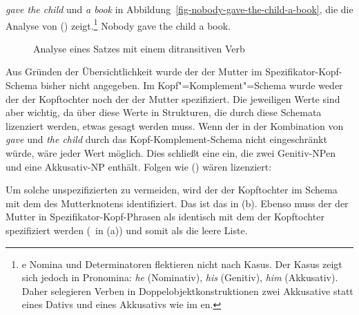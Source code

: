 \emph{gave the child} und \emph{a book} in Abbildung~\vref{fig-nobody-gave-the-child-a-book}, die die
Analyse von () zeigt.\footnote{%
  e Nomina und Determinatoren flektieren nicht nach Kasus. Der Kasus zeigt sich jedoch in Pronomina:
  \emph{he} (Nominativ), \emph{his} (Genitiv), \emph{him} (Akkusativ). Daher selegieren Verben in Doppelobjektkonstruktionen zwei Akkusative statt eines Dativs und eines Akkusativs wie im en.
}
\ea
\label{ex-nobody-gave-the-child-a-book}
Nobody gave the child a book.
\z
\begin{figure}
\caption{\label{fig-nobody-gave-the-child-a-book}Analyse eines Satzes mit einem ditransitiven Verb}
\end{figure}

Aus Gründen der Übersichtlichkeit wurde der \compsw der Mutter im
Spezifikator-Kopf-Schema bisher nicht angegeben. Im
Kopf"=Komplement"=Schema wurde weder der \sprw der Kopftochter noch der der Mutter spezifiziert. Die
jeweiligen Werte sind aber wichtig, da über diese Werte in Strukturen, die durch diese Schemata lizenziert werden,
etwas gesagt werden muss. Wenn der \sprw in der Kombination von \emph{gave} und \emph{the
  child} durch das Kopf-Komplement-Schema nicht eingeschränkt würde, wäre jeder Wert möglich. Dies
schließt eine \sprl ein, die zwei Genitiv-NPen und eine Akkusativ-NP enthält. Folgen wie () wären
lizenziert:

\z
Um solche unspezifizierten \sprwe zu vermeiden, wird der \sprw der Kopftochter im Schema mit dem \sprw des
Mutterknotens identifiziert. Das ist das  in (b). Ebenso muss der \compsw der Mutter
in Spezifikator-Kopf-Phrasen als identisch mit dem \compsw der Kopftochter spezifiziert werden
(\, in (a)) und somit als die leere Liste.

